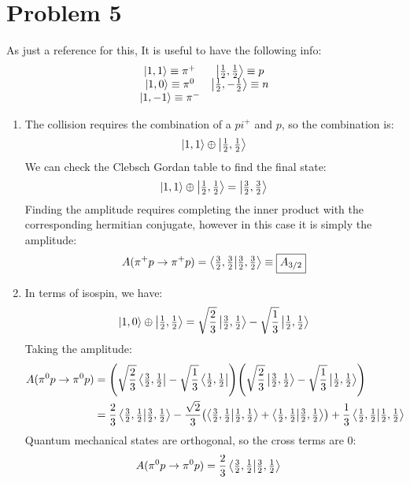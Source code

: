\documentclass[12pt]{article}
\newcommand{\ppls}{\ket{1,1}}
\newcommand{\pzro}{\ket{1,0}}
\newcommand{\prot}{\ket{\tfrac{1}{2}, \tfrac{1}{2}}}
\newcommand{\ath}{\ket{\tfrac{3}{2},\tfrac{1}{2}}}
\newcommand{\aoh}{\ket{\tfrac{1}{2},\tfrac{1}{2}}}
\newcommand{\athc}{\bra{\tfrac{3}{2},\tfrac{1}{2}}}
\newcommand{\aohc}{\bra{\tfrac{1}{2},\tfrac{1}{2}}}
\begin{document}
\section*{Problem 5}
As just a reference for this, It is useful to have the following info:
\begin{align*}
  \begin{matrix}
    \ket{1,1}\equiv\pi^+&\ket{\tfrac{1}{2},\tfrac{1}{2}}\equiv p\\
    \ket{1,0}\equiv\pi^0&\ket{\tfrac{1}{2},-\tfrac{1}{2}}\equiv n\\
    \ket{1,-1}\equiv\pi^-&
  \end{matrix}  
\end{align*}
\begin{enumerate}[label=\alph*.)]
\item The collision requires the combination of a $pi^+$ and $p$, so the combination is:
  \begin{align*}
    \ppls\oplus\prot
  \end{align*}
  We can check the Clebsch Gordan table to find the final state:
  \begin{align*}
    \ppls\oplus\prot=\ket{\tfrac{3}{2},\tfrac{3}{2}}
  \end{align*}
  Finding the amplitude requires completing the inner product with the corresponding hermitian conjugate, however in this case it is simply the amplitude:
  \begin{align*}
    A(\pi^+p\to\pi^+p)=\ip{\tfrac{3}{2},\tfrac{3}{2}}\equiv \boxed{A_{3/2}}
  \end{align*}
\item In terms of isospin, we have:
  \begin{align*}
    \pzro\oplus\prot=\sqrt{\frac{2}{3}}\ath-\sqrt{\frac{1}{3}}\aoh
  \end{align*}
  Taking the amplitude:
  \begin{align*}
    A(\pi^0p\to\pi^0p)&=\qty(\sqrt{\frac{2}{3}}\athc-\sqrt{\frac{1}{3}}\aohc)
    \qty(\sqrt{\frac{2}{3}}\ath-\sqrt{\frac{1}{3}}\aoh)\\
    &=\frac{2}{3}\ip{\tfrac{3}{2},\tfrac{1}{2}}
    -\frac{\sqrt{2}}{3}
    \qty(\ip{\tfrac{3}{2},\tfrac{1}{2}}{\tfrac{1}{2},\tfrac{1}{2}}
    +\ip{\tfrac{1}{2},\tfrac{1}{2}}{\tfrac{3}{2},\tfrac{1}{2}})
    +\frac{1}{3}\ip{\tfrac{1}{2},\tfrac{1}{2}}
  \end{align*}
  Quantum mechanical states are orthogonal, so the cross terms are $0$:
  \begin{align*}
    A(\pi^0p\to\pi^0p)&=
    \frac{2}{3}\ip{\tfrac{3}{2},\tfrac{1}{2}}

\end{align*}
\end{enumerate}
\end{document}
